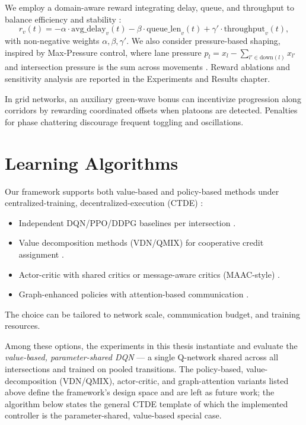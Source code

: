 \documentclass[12pt]{report} %
\begin{document}
We employ a domain-aware reward integrating delay, queue, and throughput to balance efficiency and stability \cite{MLTraffic2022,DeepTraffic2023}:
\[
r_v(t) = -\alpha \cdot \text{avg\_delay}_v(t) - \beta \cdot \text{queue\_len}_v(t) + \gamma' \cdot \text{throughput}_v(t),
\]
with non-negative weights $\alpha,\beta,\gamma'$. We also consider pressure-based shaping, inspired by Max-Pressure control, where lane pressure $p_{l}=x_l-\sum_{l'\in\text{down}(l)} x_{l'}$ and intersection pressure is the sum across movements \cite{CoordinatedDQL_2022,QMIX_TSC_2022}. Reward ablations and sensitivity analysis are reported in the Experiments and Results chapter.

In grid networks, an auxiliary green-wave bonus can incentivize progression along corridors by rewarding coordinated offsets when platoons are detected. Penalties for phase chattering discourage frequent toggling and oscillations.

\section{Learning Algorithms}

Our framework supports both value-based and policy-based methods under centralized-training, decentralized-execution (CTDE) \cite{MARL_TSC_2024,Chu2019MA2C}:
\begin{itemize}
  \item Independent DQN/PPO/DDPG baselines per intersection \cite{DQN_Traffic2022,PolicyGradient2023,DDPG_TSC_2022}.
  \item Value decomposition methods (VDN/QMIX) for cooperative credit assignment \cite{QMIX_TSC_2022,VDN_TSC_2022}.
  \item Actor-critic with shared critics or message-aware critics (MAAC-style) \cite{DistributedAC_2023,Chu2019MA2C}.
  \item Graph-enhanced policies with attention-based communication \cite{GATLight_2022,GraphLight2023,AttentionLight_2023}.
\end{itemize}
The choice can be tailored to network scale, communication budget, and training resources.

Among these options, the experiments in this thesis instantiate and evaluate the \emph{value-based, parameter-shared DQN} --- a single Q-network shared across all intersections and trained on pooled transitions. The policy-based, value-decomposition (VDN/QMIX), actor-critic, and graph-attention variants listed above define the framework's design space and are left as future work; the algorithm below states the general CTDE template of which the implemented controller is the parameter-shared, value-based special case.
\end{document}
